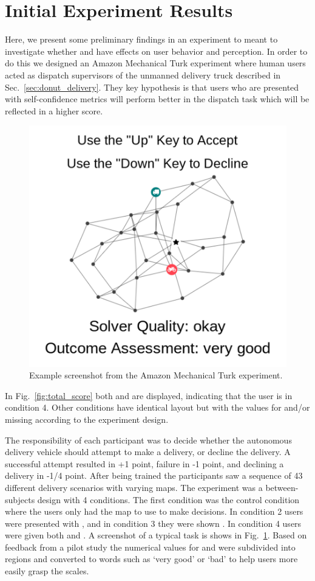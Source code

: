 \section{Initial Experiment Results} \label{sec:exp_results}
Here, we present some preliminary findings in an experiment to meant to investigate whether \xQ{} and \xO{} have effects on user behavior and perception. In order to do this we designed an Amazon Mechanical Turk experiment where human users acted as dispatch supervisors of the unmanned delivery truck described in Sec.~\ref{sec:donut_delivery}. They key hypothesis is that users who are presented with self-confidence metrics will perform better in the dispatch task which will be reflected in a higher score.

\begin{figure}[tbp]
    \centering
    \includegraphics[width=0.45\linewidth]{Figures/experiment_screenshot_Compressed.png}
    \caption{Example screenshot from the Amazon Mechanical Turk experiment.  } 
    \label{fig:experiment_screenshot}
\end{figure}

In Fig.~\ref{fig:total_score} both \xQ{} and \xO{} are displayed, indicating that the user is in condition 4. Other conditions have identical layout but with the values for \xQ{} and/or \xO{} missing according to the experiment design.

The responsibility of each participant was to decide whether the autonomous delivery vehicle should attempt to make a delivery, or decline the delivery. A successful attempt resulted in +1 point, failure in -1 point, and declining a delivery in -1/4 point. After being trained the participants saw a sequence of 43 different delivery scenarios with varying maps. The experiment was a between-subjects design with 4 conditions. The first condition was the control condition where the users only had the map to use to make decisions. In condition 2 users were presented with \xQ{}, and in condition 3 they were shown \xO{}. In condition 4 users were given both \xQ{} and \xO. A screenshot of a typical task is shows in Fig.~\ref{fig:experiment_screenshot}. Based on feedback from a pilot study the numerical values for \xQ{} and \xO{} were subdivided into regions and converted to words such as `very good' or `bad' to help users more easily grasp the scales.

